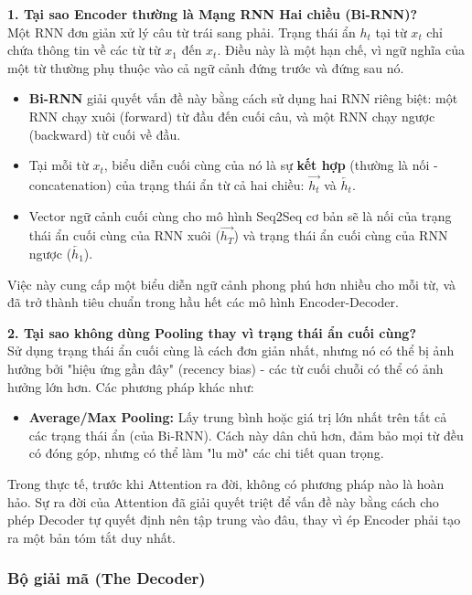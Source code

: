 \begin{tcolorbox}[
    title=Ghi chú sâu về Thiết kế của Encoder,
    colback=green!5!white, colframe=green!50!black, fonttitle=\bfseries
]
\textbf{1. Tại sao Encoder thường là Mạng RNN Hai chiều (Bi-RNN)?} \\
Một RNN đơn giản xử lý câu từ trái sang phải. Trạng thái ẩn $h_t$ tại từ $x_t$ chỉ chứa thông tin về các từ từ $x_1$ đến $x_t$. Điều này là một hạn chế, vì ngữ nghĩa của một từ thường phụ thuộc vào cả ngữ cảnh đứng trước và đứng sau nó.
\begin{itemize}
    \item \textbf{Bi-RNN} giải quyết vấn đề này bằng cách sử dụng hai RNN riêng biệt: một RNN chạy xuôi (forward) từ đầu đến cuối câu, và một RNN chạy ngược (backward) từ cuối về đầu.
    \item Tại mỗi từ $x_t$, biểu diễn cuối cùng của nó là sự \textbf{kết hợp} (thường là nối - concatenation) của trạng thái ẩn từ cả hai chiều: $\overrightarrow{h_t}$ và $\overleftarrow{h_t}$.
    \item Vector ngữ cảnh cuối cùng cho mô hình Seq2Seq cơ bản sẽ là nối của trạng thái ẩn cuối cùng của RNN xuôi ($\overrightarrow{h_T}$) và trạng thái ẩn cuối cùng của RNN ngược ($\overleftarrow{h_1}$).
\end{itemize}
Việc này cung cấp một biểu diễn ngữ cảnh phong phú hơn nhiều cho mỗi từ, và đã trở thành tiêu chuẩn trong hầu hết các mô hình Encoder-Decoder.

\textbf{2. Tại sao không dùng Pooling thay vì trạng thái ẩn cuối cùng?} \\
Sử dụng trạng thái ẩn cuối cùng là cách đơn giản nhất, nhưng nó có thể bị ảnh hưởng bởi "hiệu ứng gần đây" (recency bias) - các từ cuối chuỗi có thể có ảnh hưởng lớn hơn. Các phương pháp khác như:
\begin{itemize}
    \item \textbf{Average/Max Pooling:} Lấy trung bình hoặc giá trị lớn nhất trên tất cả các trạng thái ẩn (của Bi-RNN). Cách này dân chủ hơn, đảm bảo mọi từ đều có đóng góp, nhưng có thể làm "lu mờ" các chi tiết quan trọng.
\end{itemize}
Trong thực tế, trước khi Attention ra đời, không có phương pháp nào là hoàn hảo. Sự ra đời của Attention đã giải quyết triệt để vấn đề này bằng cách cho phép Decoder tự quyết định nên tập trung vào đâu, thay vì ép Encoder phải tạo ra một bản tóm tắt duy nhất.
\end{tcolorbox}
\subsubsection{Bộ giải mã (The Decoder)}
